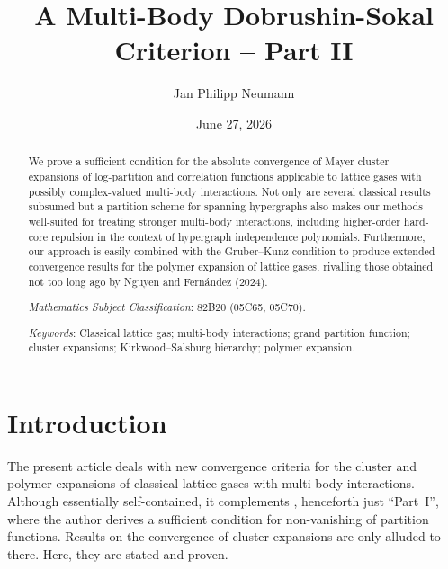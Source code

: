 \documentclass[reqno, 11pt]{amsart}
\theoremstyle{definition}
\begin{document}
\title{A Multi-Body Dobrushin-Sokal Criterion -- Part II} 
\date{June 27, 2026}
\author[J. P.~Neumann]{Jan Philipp Neumann}

\begin{abstract}
	We prove a sufficient condition for the absolute convergence of Mayer cluster expansions of log-partition and correlation functions applicable to lattice gases with possibly complex-valued multi-body interactions. 
	Not only are several classical results subsumed but a partition scheme for spanning hypergraphs also makes our methods well-suited for treating stronger multi-body interactions, including higher-order hard-core repulsion in the context of hypergraph independence polynomials. 
	Furthermore, our approach is easily combined with the Gruber--Kunz condition to produce extended convergence results for the polymer expansion of lattice gases, rivalling those obtained not too long ago by Nguyen and Fern{\'a}ndez (2024).
	
	\bigskip 
		
    \noindent \emph{Mathematics Subject Classification}: 82B20 (05C65, 05C70).
    
	\medskip     
    
    \noindent \emph{Keywords}: Classical lattice gas; multi-body interactions; grand partition function; cluster expansions; Kirkwood--Salsburg hierarchy; polymer expansion.
\end{abstract}

\maketitle

\section{Introduction}

The present article deals with new convergence criteria for the cluster and polymer expansions of classical lattice gases with multi-body interactions. 
Although essentially self-contained, it complements \cite{ref:neumann-part-i}, henceforth just ``Part~I'', where the author derives a sufficient condition for non-vanishing of partition functions. 
Results on the convergence of cluster expansions are only alluded to there. 
Here, they are stated and proven. 
\end{document}
